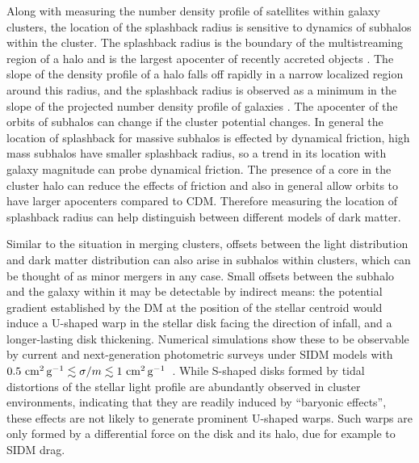 Along with measuring the number density profile of satellites within galaxy clusters, the location of the splashback radius is sensitive to dynamics of subhalos within the cluster. The splashback radius is the boundary of the multistreaming region of a halo and is the largest apocenter of recently accreted objects \cite{Diemer:2014xya,Adhikari:2014lna}. The slope of the density profile of a halo falls off rapidly in a narrow localized region around this radius, and the splashback radius is observed as a minimum in the slope of the projected number density profile of galaxies \cite{More:2016vgs,Baxter:2017csy,Chang:2017hjt}.
The apocenter of the orbits of subhalos can change if the cluster potential changes. In general the location of splashback for massive subhalos is effected by dynamical friction, high mass subhalos have smaller splashback radius, so a trend in its location with galaxy magnitude can probe dynamical friction. The presence of a core in the cluster halo can reduce the effects of friction and also in general allow orbits to have larger apocenters compared to CDM. Therefore measuring the location of splashback radius can help distinguish between different models of dark matter.

Similar to the situation in merging clusters, offsets between the light distribution and dark matter distribution can also arise in subhalos within clusters, which can be thought of as minor mergers in any case. Small offsets between the subhalo and the galaxy within it may be detectable by indirect means: the potential gradient established by the DM at the position of the stellar centroid would induce a U-shaped warp in the stellar disk facing the direction of infall, and a longer-lasting disk thickening. Numerical simulations show these to be observable by current and next-generation photometric surveys under SIDM models with $0.5 \mathrm{\,\mathrm{\,cm}^2\mathrm{\,g}^{-1}} \lesssim \sigma/m \lesssim 1 \mathrm{\,\mathrm{\,cm}^2\mathrm{\,g}^{-1}}$~\citep{Secco}. While S-shaped disks formed by tidal distortions of the stellar light profile are abundantly observed in cluster environments, indicating that they are readily induced by ``baryonic effects'', these effects are not likely to generate prominent U-shaped warps. Such warps are only formed by a differential force on the disk and its halo, due for example to SIDM drag.



\vspace{1em} 
\label{sec:merging_clusters}

